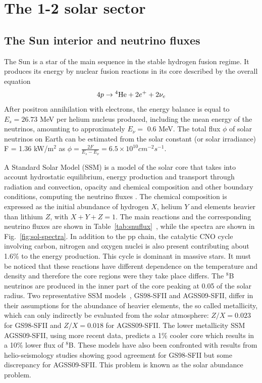 \section{The 1-2 solar sector}
\label{sec:solar}

\subsection{The Sun interior and neutrino fluxes}

The Sun is a star of the main sequence in the stable hydrogen fusion regime. It produces its energy by nuclear fusion reactions in its core described by the overall equation
\begin{equation}
4p \rightarrow {}{^4}{\rm He} + 2 e^+ + 2 \nu_e
\end{equation}
After positron annihilation with electrons, the energy balance is equal to $E_s =26.73$ MeV per helium nucleus produced, including the mean energy of the neutrinos, amounting to approximately $E_\nu =$ 0.6 MeV. The total flux $\phi$ of solar neutrinos on Earth can be estimated from the solar constant (or solar irradiance) F = 1.36 kW/m$^2$  as
$\phi = \frac{2F}{E_s - E_\nu} = 6.5 \times 10^{10} cm^{-2} s^{-1}$.

A Standard Solar Model (SSM) is a model of the solar core that takes into account hydrostatic equilibrium, energy production and transport through radiation and convection, opacity and chemical composition and other boundary conditions, computing the neutrino fluxes \cite{bahcall89}. The chemical composition is expressed as the initial abundance of hydrogen $X$, helium $Y$ and elements heavier than lithium $Z$, with $X+Y+Z = 1$.
The main reactions and the corresponding neutrino fluxes are shown in Table~\ref{tab:snuflux}~\cite{serenelli}, while the spectra are shown in Fig.~\ref{fig:sol-spectra}. 
In addition to the pp chain, the catalytic CNO cycle involving carbon, nitrogen and oxygen nuclei is also present contributing about 1.6\% to the energy production.
This cycle is dominant in massive stars.
It must be noticed that these reactions have different dependence on the temperature and density and therefore the core regions were they take place differs. The $^8$B neutrinos are produced in the inner part of the core peaking at 0.05 of the solar radius. 
Two representative SSM models~\cite{serenelli}, GS98-SFII and AGSS09-SFII, differ in their assumptions for the abundance of heavier elements, the so called metallicity, which can only indirectly be evaluated from the solar atmosphere: $Z/X=0.023$ for GS98-SFII and $Z/X=0.018$ for AGSS09-SFII. 
The lower metallicity SSM AGSS09-SFII, using more recent data, predicts a 1\% cooler core which results in a 10\% lower flux of $^8$B. These models have also been confronted with results from helio-seismology studies showing good agreement for GS98-SFII but some discrepancy for AGSS09-SFII. This problem is known as the solar abundance problem.

